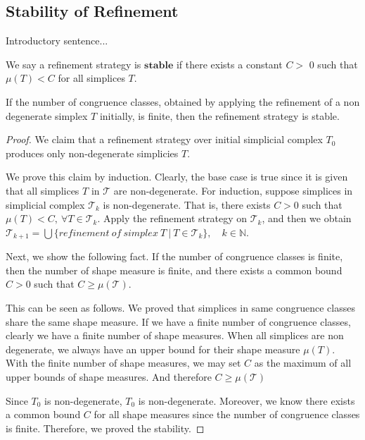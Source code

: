     \subsection{Stability of Refinement}
    Introductory sentence...
    \begin{definition*}
    We say a refinement strategy is $\textbf{stable}$ if there exists a constant $C >$ 0 such that $\mu(T)< C$ for all simplices $T$.
    \end{definition*}
    
    \begin{theorem*}
    If the number of congruence classes, obtained by applying the refinement of a non degenerate simplex $T$ initially, is finite, then the refinement strategy is stable.
    \end{theorem*}
    \begin{proof}
    
    We claim that
    a refinement strategy over initial simplicial complex $T_0$ produces only non-degenerate simplicies $T$.
    
    We prove this claim by induction.
    Clearly, the base case is true since it is given that all simplices $T$ in $\mathcal{T}$ are non-degenerate. For induction, suppose simplices in simplicial complex $\mathcal{T}_k$ is non-degenerate. That is, there exists $C > 0$ such that $\mu(T) < C, ~\forall T \in\mathcal{T}_k$. Apply the refinement strategy on $\mathcal{T}_k$, and then we obtain $\mathcal{T}_{k+1} = \bigcup\{refinement~of~simplex~T ~\vert ~T\in\mathcal{T}_{k}\}, \quad k\in\mathbb{N}$. 
    
    Next, we show the following fact.
    If the number of congruence classes is finite, then the number of shape measure is finite, and there exists a common bound $C > 0$ such that $C \geq \mu(\mathcal{T})$.
    
    This can be seen as follows.
    We proved that simplices in same congruence classes share the same shape measure. If we have a finite number of congruence classes, clearly we have a finite number of shape measures. When all simplices are non degenerate, we always have an upper bound for their shape measure $\mu(T)$. With the finite number of shape measures, we may set $C$ as the maximum of all upper bounds of shape measures. And therefore $C \geq \mu(\mathcal{T})$
    
    Since $T_0$ is non-degenerate, $T_0$ is non-degenerate. Moreover, we know there exists a common bound $C$ for all shape measures since the number of congruence classes is finite. Therefore, we proved the stability.
    \end{proof}
    
